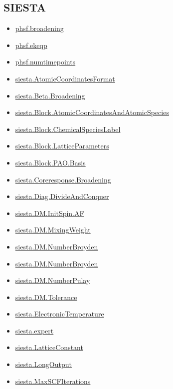 \documentclass[11pt]{article}
\begin{document}
\subsection*{SIESTA}
\begin{itemize}
\item \hyperref[kw:phsf-broadening]{phsf.broadening}
\item \hyperref[kw:phsf-ekeqp]{phsf.ekeqp}
\item \hyperref[kw:phsf-numtimepoints]{phsf.numtimepoints}
\item \hyperref[kw:siesta-AtomicCoordinatesFormat]{siesta.AtomicCoordinatesFormat}
\item \hyperref[kw:siesta-Beta-Broadening]{siesta.Beta.Broadening}
\item \hyperref[kw:siesta-Block-AtomicCoordinatesAndAtomicSpecies]{siesta.Block.AtomicCoordinatesAndAtomicSpecies}
\item \hyperref[kw:siesta-Block-ChemicalSpeciesLabel]{siesta.Block.ChemicalSpeciesLabel}
\item \hyperref[kw:siesta-Block-LatticeParameters]{siesta.Block.LatticeParameters}
\item \hyperref[kw:siesta-Block-PAO-Basis]{siesta.Block.PAO.Basis}
\item \hyperref[kw:siesta-Coreresponse-Broadening]{siesta.Coreresponse.Broadening}
\item \hyperref[kw:siesta-Diag-DivideAndConquer]{siesta.Diag.DivideAndConquer}
\item \hyperref[kw:siesta-DM-InitSpin-AF]{siesta.DM.InitSpin.AF}
\item \hyperref[kw:siesta-DM-MixingWeight]{siesta.DM.MixingWeight}
\item \hyperref[kw:siesta-DM-NumberBroyden]{siesta.DM.NumberBroyden}
\item \hyperref[kw:siesta-DM-NumberBroyden]{siesta.DM.NumberBroyden}
\item \hyperref[kw:siesta-DM-NumberPulay]{siesta.DM.NumberPulay}
\item \hyperref[kw:siesta-DM-Tolerance]{siesta.DM.Tolerance}
\item \hyperref[kw:siesta-ElectronicTemperature]{siesta.ElectronicTemperature}
\item \hyperref[kw:siesta-expert]{siesta.expert}
\item \hyperref[kw:siesta-LatticeConstant]{siesta.LatticeConstant}
\item \hyperref[kw:siesta-LongOutput]{siesta.LongOutput}
\item \hyperref[kw:siesta-MaxSCFIterations]{siesta.MaxSCFIterations}

\end{itemize}
\end{document}
